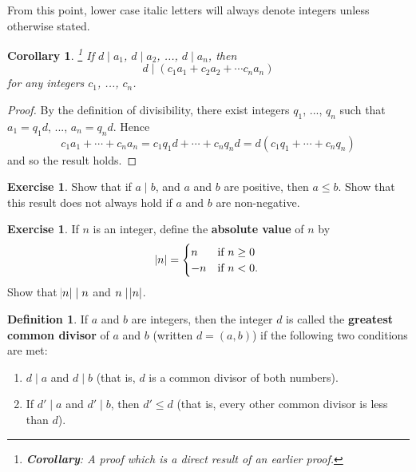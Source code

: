 \documentclass[a4paper,leqno]{article}
\numberwithin{equation}{section}
\newtheorem{cor}[equation]{Corollary}
\theoremstyle{definition}
\newtheorem{defn}[equation]{Definition}
\newtheorem{exercise}[equation]{Exercise}
\theoremstyle{remark}
\newcommand{\df}[1]{\textbf{#1}}
\begin{document}
From this point, lower case italic letters will always denote integers unless otherwise stated.

\begin{cor}\footnote{\df{Corollary}: A proof which is a direct result of an earlier proof.}
  If $ d \mid a_1 $, $ d \mid a_2 $, ..., $ d \mid a_n $, then
  \begin{displaymath}
    d \mid (c_1 a_1 + c_2 a_2 + \cdots c_n a_n)
  \end{displaymath}
  for any integers $ c_1 $, ..., $ c_n $.
\end{cor}
\begin{proof}
  By the definition of divisibility, there exist integers $ q_1 $, ..., $ q_n $ such that $ a_1 = q_1 d$, ..., $ a_n = q_n d $. Hence
  \begin{displaymath}
    c_1 a_1 + \cdots + c_n a_n = c_1 q_1 d + \cdots + c_n q_n d = d(c_1 q_1 + \cdots + c_n q_n)
  \end{displaymath}
  and so the result holds.
\end{proof}

\begin{exercise}
  Show that if $ a \mid b $, and $ a $ and $ b $ are positive, then $ a \leq b $. Show that this result
  does not always hold if $ a $ and $ b $ are non-negative.
\end{exercise}

\begin{exercise}
  If $ n $ is an integer, define the \df{absolute value} of $ n $ by
  \begin{displaymath}
    \abs{n} = \begin{cases}
                n & \text{if } n \geq 0\\
                -n & \text{if } n < 0.
              \end{cases}
  \end{displaymath}
  Show that $ \abs{n} \mid n $ and $ n \mid \abs{n} $.
\end{exercise}

\begin{defn}
  If $ a $ and $ b $ are integers, then the integer $ d $ is called the \df{greatest common divisor} of $ a $ and $ b $ (written $ d = (a,b) $)
  if the following two conditions are met:
  \begin{enumerate}
    \item $ d \mid a $ and $ d \mid b $ (that is, $ d $ is a common divisor of both numbers).
    \item If $ d' \mid a $ and $ d' \mid b $, then $ d' \leq d $ (that is, every other common divisor is less than $ d $).
  \end{enumerate}
\end{defn}
\end{document}
